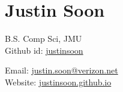 \documentclass[a4paper]{article}
\author{Justin Soon}
\begin{document}
\section*{\huge\textbf Justin Soon}
\begin{minipage}{.45\linewidth}
	\begin{flushleft}
		B.S. Comp Sci, JMU\\
		Github id: \href{https://github.com/justinsoon}{justinsoon}\\
	\end{flushleft}
\end{minipage}
\hfill
\begin{minipage}{.45\linewidth}
	\begin{flushright}
		Email: \href{mailto:justin.soon@verizon.net}{justin.soon@verizon.net}\\
		Website: \href{http://justinsoon.github.io}{justinsoon.github.io}\\
	\end{flushright}
\end{minipage}

\end{document}
